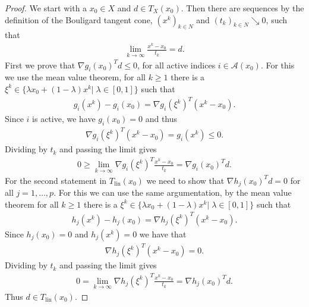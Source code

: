 \begin{proof}
    We start with a $x_0 \in X$ and $d \in T_X(x_0)$. Then there are
    sequences by the definition of the Bouligard tangent cone, $(x^{k})_{k\in N}$ and
    $(t_k)_{k \in N} \searrow 0 $, such that
    \begin{align}
        \lim_{ k \to \infty} \frac{x^k-x_0}{t_k} = d.
    \end{align}
    First we prove that $\nabla g_i(x_0)^{T} d \le 0$, for all active indices
    $i \in \mathcal{A}(x_0)$. For this we use the mean value theorem, for
    all $k\ge1$ there is a $\xi^{k}  \in \{\lambda x_0 + (1-\lambda) x^{k}|\;
    \lambda \in [0, 1]\} $ such that
    \begin{align}
        g_i(x^{k}) - g_i(x_0) = \nabla g_i(\xi^{k})^{T} (x^{k} - x_0).
    \end{align}
    Since $i$ is active, we have $g_i(x_0) = 0$ and thus
    \begin{align}
         \nabla g_i(\xi^{k})^{T} (x^{k} - x_0) = g_i(x^{k}) \le 0.
    \end{align}
    Dividing by $t_k$ and passing the limit gives
    \begin{align}
        0 \ge \lim_{k \to \infty} \nabla g_i(\xi^{k})^{T}  \frac{x^k-x_0}{t_k}
        = \nabla g_i(x_0)^{T} d.
    \end{align}
    For the second statement in $T_{\text{lin}}(x_0)$ we need to show that
    $\nabla h_j(x_0)^{T} d = 0$ for all $j=1,\ldots,p$. For this we can use
    the same argumentation, by the mean value theorem for
    all $k\ge1$ there is a $\xi^{k}  \in \{\lambda x_0 + (1-\lambda) x^{k}|\;
    \lambda \in [0, 1]\} $ such that
    \begin{align}
        h_j(x^{k}) - h_j(x_0) = \nabla h_j(\xi^{k})^{T} (x^{k} - x_0).
    \end{align}
    Since $h_j(x_0) = 0$ and $h_j(x^{k}) = 0$  we have that
    \begin{align}
        \nabla h_j(\xi^{k})^{T} (x^{k} - x_0) = 0.
    \end{align}
    Dividing by $t_k$ and passing the limit gives
    \begin{align}
        0 = \lim_{ k \to \infty} \nabla h_j(\xi^{k})^{T} \frac{x^{k} - x_0}
        {t_k}= \nabla h_j(x_0)^{T} d.
    \end{align}
    Thus $d \in T_{\text{lin}}(x_0)$.
\end{proof}

